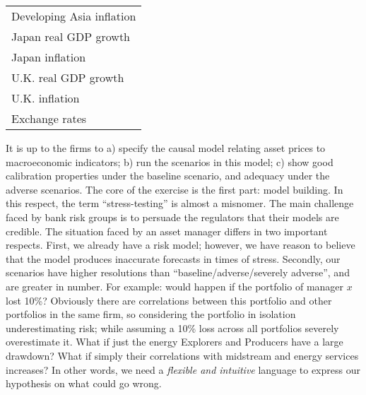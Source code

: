 \documentclass[letter, 12pt]{article}
\begin{document}
\begin{table}[ht]
\begin{tabular}{l}
Developing Asia inflation \\

Japan real GDP growth \\

Japan inflation \\

U.K. real GDP growth \\

U.K. inflation \\

Exchange rates \\

\hline

\end{tabular}

\end{table}

It is up to the firms to a) specify the causal model relating asset prices to macroeconomic indicators; b) run the scenarios in this model; c) show good calibration properties under the baseline scenario, and adequacy under the adverse scenarios. The core of the exercise is the first part: model building. In this respect, the term ``stress-testing'' is almost a misnomer. The main challenge faced by bank risk groups is to persuade the regulators that their models are credible. The situation faced by an asset manager differs in two important respects. First, we already have a risk model; however, we have reason to believe that the model produces inaccurate forecasts in times of stress. Secondly, our scenarios have higher resolutions than ``baseline/adverse/severely adverse'', and are greater in number. For example: would happen if the portfolio of manager $x$ lost 10\%? Obviously there are correlations between this portfolio and other portfolios in the same firm, so considering the portfolio in isolation underestimating risk; while assuming a 10\% loss across all portfolios severely overestimate it. What if just the energy Explorers and Producers have a large drawdown? What if simply their correlations with midstream and energy services increases? In other words, we need a \emph{flexible and intuitive} language to express our hypothesis on what could go wrong.
\end{document}
